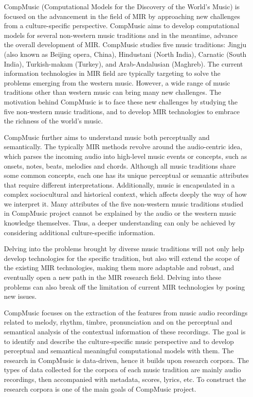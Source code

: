 CompMusic (Computational Models for the Discovery of the World's Music) is focused on the advancement in the field of MIR by approaching new challenges from a culture-specific perspective. CompMusic aims to develop computational models for several non-western music traditions and in the meantime, advance the overall development of MIR. CompMusic studies five music traditions: Jingju (also known as Beijing opera, China), Hindustani (North India), Carnatic (South India), Turkish-makam (Turkey), and Arab-Andalusian (Maghreb).  The current information technologies in MIR field are typically targeting to solve the problems emerging from the western music. However, a wide range of music traditions other than western music can bring many new challenges. The motivation behind CompMusic is to face these new challenges by studying the five non-western music traditions, and to develop MIR technologies to embrace the richness of the world's music.

CompMusic further aims to understand music both perceptually and semantically. The typically MIR methods revolve around the audio-centric idea, which parses the incoming audio into high-level music events or concepts, such as onsets, notes, beats, melodies and chords. Although all music traditions share some common concepts, each one has its unique perceptual or semantic attributes that require different interpretations. Additionally, music is encapsulated in a complex sociocultural and historical context, which affects deeply the way of how we interpret it. Many attributes of the five non-western music traditions studied in CompMusic project cannot be explained by the audio or the western music knowledge themselves. Thus, a deeper understanding can only be achieved by considering additional culture-specific information.

Delving into the problems brought by diverse music traditions will not only help develop technologies for the specific tradition, but also will extend the scope of the existing MIR technologies, making them more adaptable and robust, and eventually open a new path in the MIR research field. Delving into these problems can also break off the limitation of current MIR technologies by posing new issues. 

CompMusic focuses on the extraction of the features from music audio recordings related to melody, rhythm, timbre, pronunciation and on the perceptual and semantical analysis of the contextual information of these recordings. The goal is to identify and describe the culture-specific music perspective and to develop perceptual and semantical meaningful computational models with them. The research in CompMusic is data-driven, hence it builds upon research corpora. The types of data collected for the corpora of each music tradition are mainly audio recordings, then accompanied with metadata, scores, lyrics, etc. To construct the research corpora is one of the main goals of CompMusic project.

